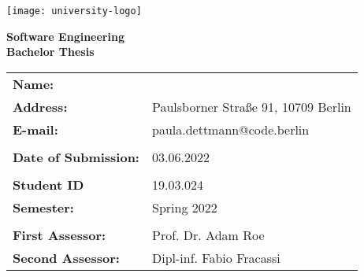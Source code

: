 \begin{titlepage}
	\begin{center}
		\texttt{[image: university-logo]}

		\vspace*{0.8cm}

		\textbf{Software Engineering}\\
		\textbf{Bachelor Thesis}

		\vfill

		\textbf{\large\thetitle}
	\end{center}

	\vfill

	\noindent\hspace{1mm}\makebox[2in]{\rule{2in}{0.4mm}}
	\vspace{5mm}

	\begin{spacing}{1.1}
		\noindent
		\setlength{\tabcolsep}{20pt}
		\begin{tabular}{@{}ll}
		\textbf{Name:} & \theauthor \\
        \textbf{Address:} & Paulsborner Straße 91, 10709 Berlin \\
        \textbf{E-mail:} & paula.dettmann@code.berlin\\
        \\
        \textbf{Date of Submission:} & 03.06.2022\\
        \\
        \textbf{Student ID} & 19.03.024 \\
		\textbf{Semester:} & Spring 2022\\
		\\
		\textbf{First Assessor:} & Prof. Dr. Adam Roe\\
		\textbf{Second Assessor:} & Dipl-inf. Fabio Fracassi\\
		\end{tabular}
	\end{spacing}
\end{titlepage}
